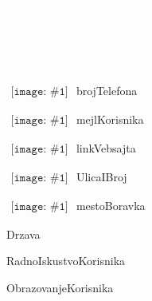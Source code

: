 \documentclass{article}
\newcommand{\ContactEntry}[2]{
	$\begin{array}{l}
	{\texttt{[image: \#1]}}
	\end{array}
	$ #2
}
\newcommand{\ExperienceEntry}[5]{
\begin{tabular}{  p{\dimexpr 0.15\linewidth-2\tabcolsep} 
                   p{\dimexpr 0.70\linewidth-2\tabcolsep}}
  \textbf{\textcolor{materialRedDark}{#1-}}\textbf{\textcolor{materialRed}{#2}}\hspace{20pt} & \textbf{#3}\\
  	& \normalsize #4\\
  	&{\small \textcolor{textLightGray}{#5}}
\end{tabular}
\vspace*{10pt}
}
\newcommand{\EducationEntry}[5]{
\begin{tabular}{  p{\dimexpr 0.15\linewidth-2\tabcolsep} 
                   p{\dimexpr 0.70\linewidth-2\tabcolsep}}
  \textbf{\textcolor{materialBlueDark}{#1-}}\textbf{\textcolor{materialBlue}{#2}}\hspace{20pt} & \textbf{#3}\\
  	& \normalsize #4\\
  	&{\small \textcolor{textLightGray}{#5}}
\end{tabular}
\vspace*{10pt}
}
\begin{document}
	\color{textGray}
	\vspace*{105pt} %
	\Huge
	\BgThispage
		\textcolor{white}{ImeKorisnika}

		\textcolor{white}{PrezimeKorisnika}
	\BgThispage
	\vspace*{20pt}

	
\LARGE
\noindent\colorbox{materialGreenDark}
{\parbox[c][25pt][c]{\textwidth}{\hspace{15pt}\textcolor{white}{Contacts}}} %

\begin{multicols}{2}

\large
\ContactEntry{images/green/telephone1}{brojTelefona}

\ContactEntry{images/green/mail9}{mejlKorisnika}

\ContactEntry{images/green/links1}{linkVebsajta}

\columnbreak

\ContactEntry{images/green/house3}{UlicaIBroj}

\ContactEntry{images/green/map5}{mestoBoravka

\hspace*{25pt} Drzava}

\end{multicols}

	
RadnoIskustvoKorisnika



ObrazovanjeKorisnika
\end{document}
